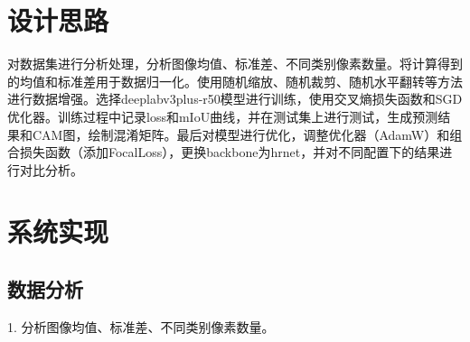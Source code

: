 \documentclass[12pt]{ctexart}
\newcommand{\cmark}{\ding{51}}
\newcommand{\checkbox}{\ding{111}}
\begin{document}
\section{设计思路}
对数据集进行分析处理，分析图像均值、标准差、不同类别像素数量。将计算得到的均值和标准差用于数据归一化。使用随机缩放、随机裁剪、随机水平翻转等方法进行数据增强。选择deeplabv3plus-r50模型进行训练，使用交叉熵损失函数和SGD优化器。训练过程中记录loss和mIoU曲线，并在测试集上进行测试，生成预测结果和CAM图，绘制混淆矩阵。最后对模型进行优化，调整优化器（AdamW）和组合损失函数（添加FocalLoss），更换backbone为hrnet，并对不同配置下的结果进行对比分析。
\section{系统实现}
\subsection{数据分析}
1. 分析图像均值、标准差、不同类别像素数量。


        
        
\end{document}
